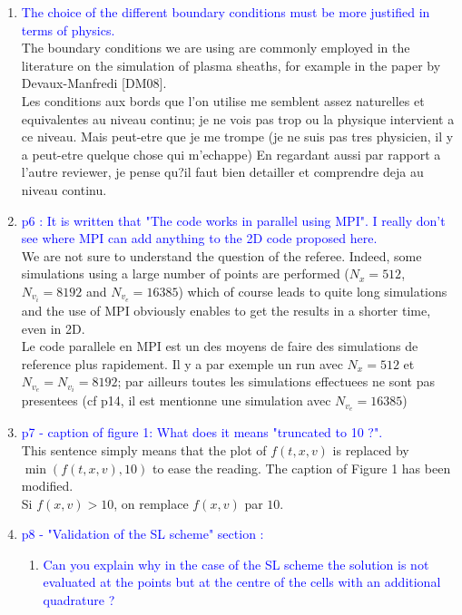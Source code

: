\documentclass{article}
\begin{document}
\begin{enumerate}
    \item \textcolor{blue}{The choice of the different boundary conditions must be more justified in terms of physics. }\\
The boundary conditions we are using are commonly employed in the literature on the simulation of plasma sheaths, 
for example in the paper by Devaux-Manfredi [DM08].   \\%
{\small Les conditions aux bords que l'on utilise me semblent assez naturelles et equivalentes au niveau continu; je ne vois pas trop ou la physique intervient a ce niveau.
Mais peut-etre que je me trompe (je ne suis pas tres physicien, il y a peut-etre quelque chose qui m'echappe)
En regardant aussi par rapport a l'autre reviewer, je pense qu?il faut bien detailler et comprendre deja au niveau continu.}
    \item \textcolor{blue}{p6 : It is written that "The code works in parallel using MPI". I really don't see where MPI can add anything to the 2D code proposed here. }\\ 
    We are not sure to understand the question of the referee. Indeed, some simulations using a large number of points are performed 
    ($N_x=512$, $N_{v_i}=8192$ and $N_{v_e}=16385$) which of course leads to quite long simulations and the use of MPI obviously 
    enables to get the results in a shorter time, even in 2D. \\
    {\small Le code parallele en MPI est un des moyens de faire des simulations de reference plus rapidement.
Il y a par exemple un run avec $N_x=512$ et $N_{v_e}=N_{v_i}=8192$; par ailleurs toutes les simulations effectuees ne sont pas presentees
(cf p14, il est mentionne une simulation avec $N_{v_e}=16385$)}
    \item \textcolor{blue}{p7 - caption of figure 1: What does it means "truncated to 10 ?". }\\
    This sentence simply means that the plot of $f(t, x, v)$ is replaced by $\min(f(t, x, v), 10)$ to ease the reading. The caption of Figure 1 has been modified. \\
    {\small Si $f(x,v)>10$, on remplace $f(x,v)$ par $10$. }
    \item \textcolor{blue}{p8 - "Validation of the SL scheme" section :}
\begin{enumerate}
\item \textcolor{blue}{Can you explain why in the case of the SL scheme the solution is not evaluated at the points but at the centre of the cells with an additional quadrature ?}\\

\end{enumerate}
\end{enumerate}
\end{document}
